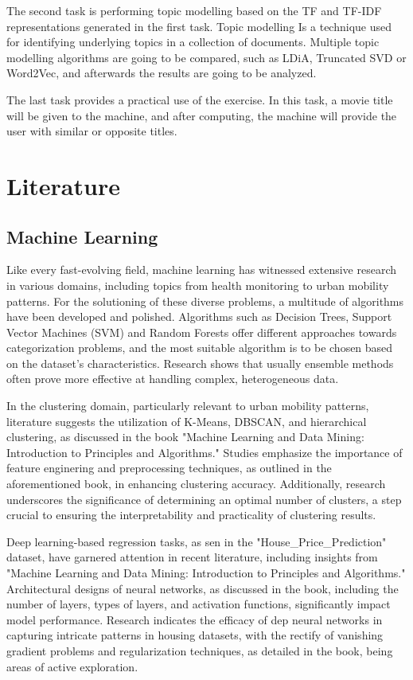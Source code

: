 \documentclass{article}
\begin{document}
\begin{multicols}{2}
The second task is performing topic modelling based on the TF and TF-IDF representations generated in the first task. Topic modelling Is a technique used for identifying underlying topics in a collection of documents. Multiple topic modelling algorithms are going to be compared, such as LDiA, Truncated SVD or Word2Vec, and afterwards the results are going to be analyzed.

The last task provides a practical use of the exercise. In this task, a movie title will be given to the machine, and after computing, the machine will provide the user with similar or opposite titles.


\section{Literature}

\subsection{Machine Learning}

Like every fast-evolving field, machine learning has witnessed extensive research in various domains, including topics from health monitoring to urban mobility patterns. For the solutioning of these diverse problems, a multitude of algorithms have been developed and polished. Algorithms such as Decision Trees, Support Vector Machines (SVM) and Random Forests offer different approaches towards categorization problems, and the most suitable algorithm is to be chosen based on the dataset's characteristics. Research shows that usually ensemble methods often prove more effective at handling complex, heterogeneous data.

In the clustering domain, particularly relevant to urban mobility patterns, literature suggests the utilization of K-Means, DBSCAN, and hierarchical clustering, as discussed in the book "Machine Learning and Data Mining: Introduction to Principles and Algorithms." Studies emphasize the importance of feature enginering and preprocessing techniques, as outlined in the aforementioned book, in enhancing clustering accuracy. Additionally, research underscores the significance of determining an optimal number of clusters, a step crucial to ensuring the interpretability and practicality of clustering results.

Deep learning-based regression tasks, as sen in the "House\_Price\_Prediction" dataset, have garnered attention in recent literature, including insights from "Machine Learning and Data Mining: Introduction to Principles and Algorithms." Architectural designs of neural networks, as discussed in the book, including the number of layers, types of layers, and activation functions, significantly impact model performance. Research indicates the efficacy of dep neural networks in capturing intricate patterns in housing datasets, with the rectify of vanishing gradient problems and regularization techniques, as detailed in the book, being areas of active exploration.


\end{multicols}
\end{document}
